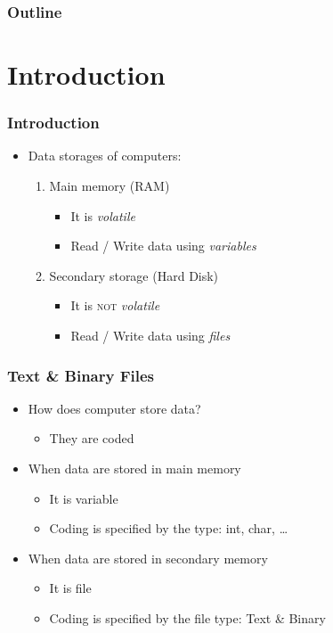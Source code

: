 \documentclass{../c-lecture}
\subtitle{Files}
\begin{document}
\begin{frame}
  \titlepage{}
\end{frame}
\begin{frame}
  \frametitle{Outline}
  \tableofcontents{}
\end{frame}

\section{Introduction}

\begin{frame}
  \frametitle{Introduction}
  \begin{itemize}
    \item Data storages of computers:
    \begin{enumerate}
      \item Main memory (RAM)
      \begin{itemize}
        \item It is \textit{\color{YellowOrange} volatile}
        \item Read / Write data using \textit{\color{LimeGreen} variables}
      \end{itemize}
      \item Secondary storage (Hard Disk)
      \begin{itemize}
        \item
          It is \textsc{\color{RubineRed} not}
          \textit{\color{YellowOrange} volatile}

        \item Read / Write data using \textit{\color{LimeGreen} files}
      \end{itemize}
    \end{enumerate}
  \end{itemize}
\end{frame}

\begin{frame}
  \frametitle{Text \& Binary Files}
  \begin{itemize}
    \item How does computer store data?
    \begin{itemize}
      \item They are coded
    \end{itemize}
    \item When data are stored in main memory
    \begin{itemize}
      \item It is variable
      \item Coding is specified by the type: int, char, \ldots
    \end{itemize}
    \item When data are stored in secondary memory
    \begin{itemize}
      \item It is file
      \item Coding is specified by the file type: Text \& Binary
    \end{itemize}
  \end{itemize}
\end{frame}
\end{document}
